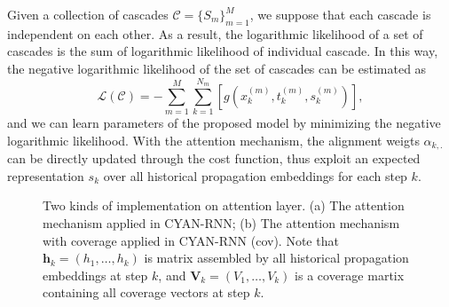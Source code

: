 Given a collection of cascades $\mathcal{C}=\{S_m\}_{m=1}^M$, we suppose that
each cascade is independent on each other. As a result, the logarithmic
likelihood of a set of cascades is the sum of logarithmic likelihood of individual cascade.
In this way, the negative logarithmic likelihood of the set of cascades can be
estimated as
\begin{equation}
\mathcal{L}(\mathcal{C})=-\sum_{m=1}^M \sum_{k=1}^{N_m} \left[
g(x_k^{(m)}, t_{k}^{(m)}, s_{k}^{(m)}) \right], 
\end{equation}
and we can learn parameters of the proposed model by minimizing the negative
logarithmic likelihood.
With the attention mechanism, the alignment
weigts $\alpha_{k,.}$ can be directly updated through the cost function, thus
exploit an expected representation $s_k$ over all historical propagation
embeddings for each step $k$.


 
\begin{figure}[ht!]
\centering
{}
\caption{Two kinds of implementation on attention layer. (a) The attention
mechanism applied in CYAN-RNN; (b) The attention mechanism with coverage applied
in CYAN-RNN (cov). Note that $\textbf{h}_k=(h_1,\ldots,h_k)$ is matrix assembled by all
historical propagation embeddings at step $k$, and
$\textbf{V}_k=(V_1,\ldots,V_k)$ is a coverage martix containing all coverage
vectors at step $k$.}
\end{figure}

